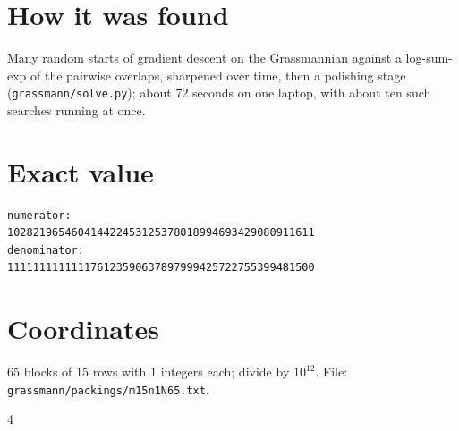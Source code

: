 \documentclass[11pt,a4paper]{article}
\begin{document}
\section{How it was found}
Many random starts of gradient descent on the Grassmannian against a log-sum-exp of the pairwise overlaps, sharpened over time, then a polishing stage (\texttt{grassmann/solve.py}); about 72 seconds on one laptop, with about ten such searches running at once.


\appendix
\section{Exact value}
{\small
\begin{verbatim}
numerator:
102821965460414422453125378018994693429080911611
denominator:
111111111111176123590637897999425722755399481500
\end{verbatim}}

\section{Coordinates}
65 blocks of 15 rows with 1 integers each; divide by $10^{12}$. File: \texttt{grassmann/packings/m15n1N65.txt}.
{\tiny
\begin{multicols}{4}
\end{multicols}}
\end{document}
